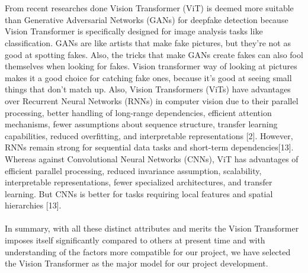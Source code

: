 \\\\
From recent researches done Vision Transformer (ViT) is deemed more suitable than Generative Adversarial Networks (GANs) for deepfake detection because Vision Transformer is specifically designed for image analysis tasks like classification. GANs are like artists that make fake pictures, but they're not as good at spotting fakes. Also, the tricks that make GANs create fakes can also fool themselves when looking for fakes. Vision transformer way of looking at pictures makes it a good choice for catching fake ones, because it's good at seeing small things that don't match up. Also, Vision Transformers (ViTs) have advantages over Recurrent Neural Networks (RNNs) in computer vision due to their parallel processing, better handling of long-range dependencies, efficient attention mechanisms, fewer assumptions about sequence structure, transfer learning capabilities, reduced overfitting, and interpretable representations [2]. However, RNNs remain strong for sequential data tasks and short-term dependencies[13]. Whereas against Convolutional Neural Networks (CNNs), ViT has advantages of efficient parallel processing, reduced invariance assumption, scalability, interpretable representations, fewer specialized architectures, and transfer learning. But CNNs is better for tasks requiring local features and spatial hierarchies [13].
\\\\
In summary, with all these distinct attributes and merits the Vision Transformer imposes itself significantly compared to others at present time and with understanding of the factors more compatible for our project, we have selected the Vision Transformer as the major model for our project development.

